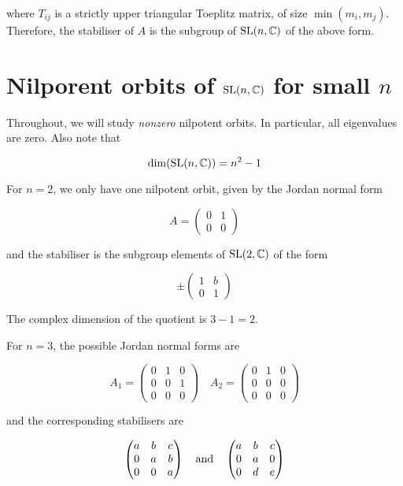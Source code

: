 \documentclass{article}
\begin{document}
where \(T_{ij}\) is a strictly upper triangular Toeplitz matrix, of size \(\min(m_i, m_j)\). Therefore, the stabiliser of \(A\) is the subgroup of \(\operatorname{SL}(n, \mathbb{C})\) of the above form.

\section{Nilporent orbits of \(\operatorname{SL}(n, \mathbb{C})\) for small \(n\)}

Throughout, we will study \emph{nonzero} nilpotent orbits. In particular, all eigenvalues are zero. Also note that

\[\dim(\operatorname{SL}(n, \mathbb{C})) = n^2 - 1\]

For \(n = 2\), we only have one nilpotent orbit, given by the Jordan normal form

\[A = \begin{pmatrix}
    0 & 1 \\ 0 & 0
\end{pmatrix}\]

and the stabiliser is the subgroup elements of \(\operatorname{SL}(2, \mathbb{C})\) of the form

\[\pm\begin{pmatrix}
    1 & b \\ 0 & 1
\end{pmatrix}\]

The complex dimension of the quotient is \(3 - 1 = 2\).

For \(n = 3\), the possible Jordan normal forms are

\[A_1 = \begin{pmatrix}
    0 & 1 & 0 \\
    0 & 0 & 1 \\
    0 & 0 & 0
\end{pmatrix} \quad A_2 = \begin{pmatrix}
    0 & 1 & 0 \\
    0 & 0 & 0 \\
    0 & 0 & 0
\end{pmatrix}\]

and the corresponding stabilisers are

\[\begin{pmatrix}
    a & b & c \\
    0 & a & b \\
    0 & 0 & a
\end{pmatrix} \qqtext{and} \begin{pmatrix}
    a & b & c \\
    0 & a & 0 \\
    0 & d & e
\end{pmatrix}\]
\end{document}
